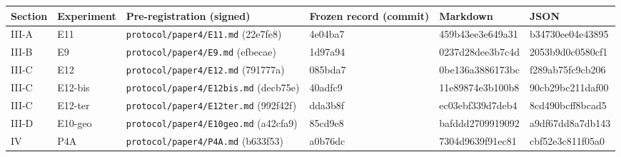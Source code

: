 \begin{center}
\centering\footnotesize
\renewcommand{\arraystretch}{1.15}
\begin{tabularx}{\textwidth}{>{\raggedright\arraybackslash\hsize=0.509\hsize}X>{\raggedright\arraybackslash\hsize=0.679\hsize}X>{\raggedright\arraybackslash\hsize=2.208\hsize}X>{\raggedright\arraybackslash\hsize=0.566\hsize}X>{\raggedright\arraybackslash\hsize=1.019\hsize}X>{\raggedright\arraybackslash\hsize=1.019\hsize}X}
\toprule
\textbf{Section} & \textbf{Experiment} & \textbf{Pre-registration (signed)} & \textbf{Frozen record (commit)} & \textbf{Markdown} & \textbf{JSON} \\
\midrule
III-A & E11 & \texttt{protocol/\allowbreak{}paper4/\allowbreak{}E11.\allowbreak{}md} (22e7fe8) & 4e04ba7 & 459b43ee3e649a31 & b34730ee04e43895 \\
III-B & E9 & \texttt{protocol/\allowbreak{}paper4/\allowbreak{}E9.\allowbreak{}md} (efbecae) & 1d97a94 & 0237d28dee3b7c4d & 2053b9d0c0580cf1 \\
III-C & E12 & \texttt{protocol/\allowbreak{}paper4/\allowbreak{}E12.\allowbreak{}md} (791777a) & 085bda7 & 0be136a3886173bc & f289ab75fc9cb206 \\
III-C & E12-bis & \texttt{protocol/\allowbreak{}paper4/\allowbreak{}E12bis.\allowbreak{}md} (decb75e) & 40adfc9 & 11e89874e3b100b8 & 90cb29bc211daf00 \\
III-C & E12-ter & \texttt{protocol/\allowbreak{}paper4/\allowbreak{}E12ter.\allowbreak{}md} (992f42f) & dda3b8f & ec03ebf339d7deb4 & 8cd490bcff8bcad5 \\
III-D & E10-geo & \texttt{protocol/\allowbreak{}paper4/\allowbreak{}E10geo.\allowbreak{}md} (a42cfa9) & 85cd9e8 & bafddd2709919092 & a9df67dd8a7db143 \\
IV & P4A & \texttt{protocol/\allowbreak{}paper4/\allowbreak{}P4A.\allowbreak{}md} (b633f53) & a0b76dc & 7304d9639f91ec81 & cbf52e3c811f05a0 \\
\bottomrule
\end{tabularx}
\end{center}

